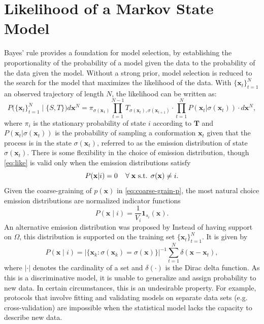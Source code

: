 \documentclass[journal=jpcbfk, layout=traditional, manuscript=article]{achemso}
\begin{document}
\section{Likelihood of a Markov State Model}
Bayes' rule provides a foundation for model selection, by establishing the proportionality of the probability of a model given the data to the probability of the data given the model. Without a strong prior, model selection is reduced to the search for the model that maximizes the likelihood of the data. 
With $\{\mathbf{x}_t\}_{t=1}^N$ an observed trajectory of length $N$, the likelihood can be written as:
\begin{equation}
P\big(\{\mathbf{x}_t\}_{t=1}^N\;\big|\; \{S, T\}\big)d\mathbf{x}^N = \pi_{\sigma(\mathbf{x}_1)}\prod_{t=1}^{N-1} T_{\sigma(\mathbf{x}_t), \sigma(\mathbf{x}_{t+1})} \cdot \prod_{t=1}^{N} P(\mathbf{x}_t | \sigma(\mathbf{x}_t)) \cdot d\mathbf{x}^N,
\label{eq:like}
\end{equation} 
where $\pi_i$ is the stationary probability of state $i$ according to $\mathbf{T}$ and $P(\mathbf{x}_t | \sigma(\mathbf{x}_t))$ is the probability of sampling a conformation $\mathbf{x}_t$ given that the process is in the state $\sigma(\mathbf{x}_t)$, referred to as the emission distribution of state $\sigma(\mathbf{x}_t)$. There is some flexibility in the choice of emission distribution, though \cref{eq:like} is valid only when the emission distributions satisfy
\begin{equation}
P(\mathbf{x} | i) = 0 \;\;\;\; \forall \; \mathbf{x} \textnormal{ s.t. } \sigma(\mathbf{x}) \neq i.
\end{equation}
Given the coarse-graining of $p(\mathbf{x})$ in \cref{eq:coarse-grain-p}, the most natural choice emission distributions are normalized indicator functions
\begin{equation}
P(\mathbf{x} \;|\; i) = \frac{1}{V_i} \mathbf{1}_{s_i}(\mathbf{x}).
\end{equation}
An alternative emission distribution was proposed by \citet{Kellogg2012Evaluation} Instead of having support on $\Omega$, this distribution is supported on the training set $\{\mathbf{x}_t\}_{t=1}^N$. It is given by
\begin{equation}
P(\mathbf{x} \;|\; i) = \big| \{ \mathbf{x}_k : \sigma(\mathbf{x}_k) = \sigma(\mathbf{x}) \} \big|^{-1} \sum_{t=1}^N \delta(\mathbf{x}-\mathbf{x}_t),
\end{equation} where $| \cdot |$ denotes the cardinality of a set and $\delta(\cdot)$ is the Dirac delta function. As this is a discriminative model, it is unable to generalize and assign probability to new data. In certain circumstances, this is an undesirable property. For example, protocols that involve fitting and validating models on separate data sets (e.g. cross-validation) are impossible when the statistical model lacks the capacity to describe new data.
\end{document}
